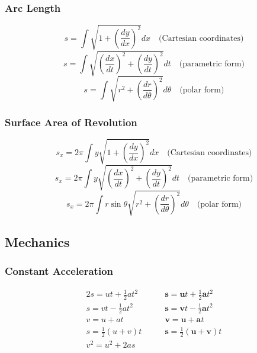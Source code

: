 \documentclass{book}
\begin{document}
            \subsubsection{Arc Length}
            \begin{equation}
                s=\int\sqrt{1+\left(\frac{dy}{dx}\right)^2}dx\quad\text{(Cartesian coordinates)}
            \end{equation}
            \begin{equation}
                s=\int\sqrt{\left(\frac{dx}{dt}\right)^2+\left(\frac{dy}{dt}\right)^2}dt\quad\text{(parametric form)}
            \end{equation}
            \begin{equation}
                s=\int\sqrt{r^2+\left(\frac{dr}{d\theta}\right)^2}d\theta\quad\text{(polar form)}
            \end{equation}

            \subsubsection{Surface Area of Revolution}
            \begin{equation}
                s_x=2\pi\int y\sqrt{1+\left(\frac{dy}{dx}\right)^2}dx\quad\text{(Cartesian coordinates)}
            \end{equation}
            \begin{equation}
                s_x=2\pi\int y\sqrt{\left(\frac{dx}{dt}\right)^2+\left(\frac{dy}{dt}\right)^2}dt\quad\text{(parametric form)}
            \end{equation}
            \begin{equation}
                s_x=2\pi\int r\sin\theta\sqrt{r^2+\left(\frac{dr}{d\theta}\right)^2}d\theta\quad\text{(polar form)}
            \end{equation}

            \subsection{Mechanics}
            \subsubsection{Constant Acceleration}
            \begin{alignat}{2}
                s=ut+\frac{1}{2}at^2&\qquad\textbf{s}=\textbf{u}t+\frac{1}{2}\textbf{a}t^2 \\
                s=vt-\frac{1}{2}at^2&\qquad\textbf{s}=\textbf{v}t-\frac{1}{2}\textbf{a}t^2 \\
                v=u+at&\qquad\textbf{v}=\textbf{u}+\textbf{a}t \\
                s=\frac{1}{2}(u+v)t&\qquad\textbf{s}=\frac{1}{2}(\textbf{u}+\textbf{v})t \\
                v^2=u^2+2as&
            \end{alignat}
\end{document}
